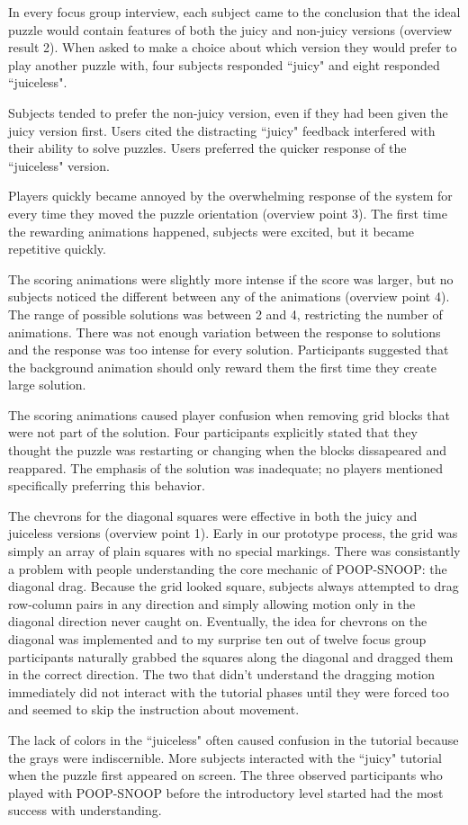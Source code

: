 In every focus group interview, each subject came to the conclusion that the ideal puzzle would contain features of both the juicy and non-juicy versions (overview result 2). When asked to make a choice about which version they would prefer to play another puzzle with, four subjects responded ``juicy" and eight responded ``juiceless".

Subjects tended to prefer the non-juicy version, even if they had been given the juicy version first. Users cited the distracting ``juicy" feedback interfered with their ability to solve puzzles. Users preferred the quicker response of the ``juiceless" version.

Players quickly became annoyed by the overwhelming response of the system for every time they moved the puzzle orientation (overview point 3). The first time the rewarding animations happened, subjects were excited, but it became repetitive quickly. 

The scoring animations were slightly more intense if the score was larger, but no subjects noticed the different between any of the animations (overview point 4). The range of possible solutions was between 2 and 4, restricting the number of animations. There was not enough variation between the response to solutions and the response was too intense for every solution. Participants suggested that the background animation should only reward them the first time they create large solution.

The scoring animations caused player confusion when removing grid blocks that were not part of the solution. Four participants explicitly stated that they thought the puzzle was restarting or changing when the blocks dissapeared and reappared. The emphasis of the solution was inadequate; no players mentioned specifically preferring this behavior.

The chevrons for the diagonal squares were effective in both the juicy and juiceless versions (overview point 1). Early in our prototype process, the grid was simply an array of plain squares with no special markings. There was consistantly a problem with people understanding the core mechanic of POOP-SNOOP: the diagonal drag. Because the grid looked square, subjects always attempted to drag row-column pairs in any direction and simply allowing motion only in the diagonal direction never caught on. Eventually, the idea for chevrons on the diagonal was implemented and to my surprise ten out of twelve focus group participants naturally grabbed the squares along the diagonal and dragged them in the correct direction. The two that didn't understand the dragging motion immediately did not interact with the tutorial phases until they were forced too and seemed to skip the instruction about movement.

The lack of colors in the ``juiceless" often caused confusion in the tutorial because the grays were indiscernible. More subjects interacted with the ``juicy" tutorial when the puzzle first appeared on screen. The three observed participants who played with POOP-SNOOP before the introductory level started had the most success with understanding.
